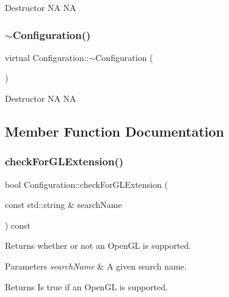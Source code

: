 Destructor  NA  NA \mbox{\label{classConfiguration_a1226f87dc3c27be16eb16e53301eb2f3}} 
\subsubsection{\texorpdfstring{$\sim$\+Configuration()}{~Configuration()}\hspace{0.1cm}{\footnotesize\ttfamily [2/2]}}
{\footnotesize\ttfamily virtual Configuration\+::$\sim$\+Configuration (\begin{DoxyParamCaption}{ }\end{DoxyParamCaption})\hspace{0.3cm}{\ttfamily [virtual]}}

Destructor  NA  NA 

\subsection{Member Function Documentation}
\mbox{\label{classConfiguration_a09fd5d87edb45d08c701e048d5ff30f9}} 
\subsubsection{\texorpdfstring{check\+For\+G\+L\+Extension()}{checkForGLExtension()}\hspace{0.1cm}{\footnotesize\ttfamily [1/2]}}
{\footnotesize\ttfamily bool Configuration\+::check\+For\+G\+L\+Extension (\begin{DoxyParamCaption}\item[{const std\+::string \&}]{search\+Name }\end{DoxyParamCaption}) const}

Returns whether or not an Open\+GL is supported.


\begin{DoxyParams}{Parameters}
{\em search\+Name} & A given search name. \\
\hline
\end{DoxyParams}
\begin{DoxyReturn}{Returns}
Is true if an Open\+GL is supported. 
\end{DoxyReturn}
\mbox{\label{classConfiguration_a09fd5d87edb45d08c701e048d5ff30f9}} 
